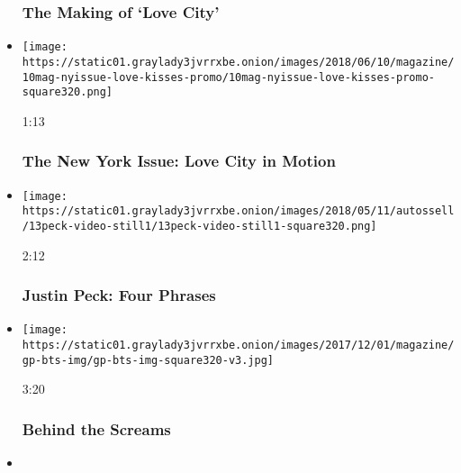 \begin{itemize}
{  \subsubsection{The Making of `Love
  City'}\label{the-making-of-love-city}}
\item
  \href{https://www.nytimes3xbfgragh.onion/video/magazine/100000005939489/the-new-york-issue-love-city-in-motion.html?action=click\&module=video-series-bar\&region=header\&pgtype=Article\&playlistId=video/magazine}{}

  \texttt{[image: https://static01.graylady3jvrrxbe.onion/images/2018/06/10/magazine/10mag-nyissue-love-kisses-promo/10mag-nyissue-love-kisses-promo-square320.png]}

  1:13

  \hypertarget{the-new-york-issue-love-city-in-motion}{%
  \subsubsection{The New York Issue: Love City in
  Motion}\label{the-new-york-issue-love-city-in-motion}}
\item
  \href{https://www.nytimes3xbfgragh.onion/video/magazine/100000005893670/four-phrases-justin-peck-ballet-improvisations.html?action=click\&module=video-series-bar\&region=header\&pgtype=Article\&playlistId=video/magazine}{}

  \texttt{[image: https://static01.graylady3jvrrxbe.onion/images/2018/05/11/autossell/13peck-video-still1/13peck-video-still1-square320.png]}

  2:12

  \hypertarget{justin-peck-four-phrases}{%
  \subsubsection{Justin Peck: Four
  Phrases}\label{justin-peck-four-phrases}}
\item
  \href{https://www.nytimes3xbfgragh.onion/video/magazine/100000005593268/behind-the-screams.html?action=click\&module=video-series-bar\&region=header\&pgtype=Article\&playlistId=video/magazine}{}

  \texttt{[image: https://static01.graylady3jvrrxbe.onion/images/2017/12/01/magazine/gp-bts-img/gp-bts-img-square320-v3.jpg]}

  3:20

  \hypertarget{behind-the-screams}{%
  \subsubsection{Behind the Screams}\label{behind-the-screams}}
\item
  \href{https://www.nytimes3xbfgragh.onion/video/magazine/100000005588849/andy-serkis-the-demented-clown.html?action=click\&module=video-series-bar\&region=header\&pgtype=Article\&playlistId=video/magazine}{}


\end{itemize}
